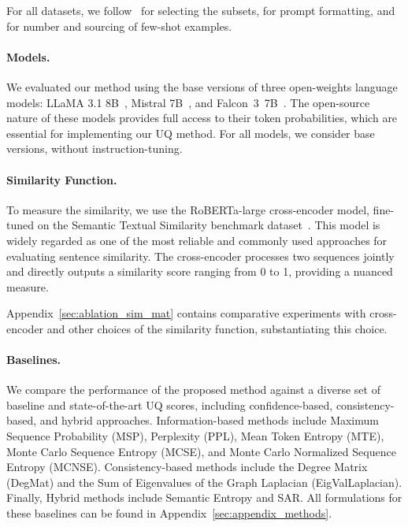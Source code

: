   For all datasets, we follow~\citep{vashurin2024benchmarkinguncertaintyquantificationmethods} for selecting the subsets, for prompt formatting, and for number and sourcing of few-shot examples.

\paragraph{Models.}
  We evaluated our method using the base versions of three open-weights language models: LLaMA 3.1 8B~\cite{touvron2023llama}, Mistral 7B~\cite{mistral}, and Falcon~3~7B~\cite{Falcon3}. The open-source nature of these models provides full access to their token probabilities, which are essential for implementing our UQ method. For all models, we consider base versions, without instruction-tuning.

   

\paragraph{Similarity Function.}
  To measure the similarity, we use the RoBERTa-large cross-encoder model, fine-tuned on the Semantic Textual Similarity benchmark dataset~\citep{liu2019robertarobustlyoptimizedbert,DBLP:journals/corr/abs-1908-10084,huggingface:dataset:stsb_multi_mt}. This model is widely regarded as one of the most reliable and commonly used approaches for evaluating sentence similarity. The cross-encoder processes two sequences jointly and directly outputs a similarity score ranging from 0 to 1, providing a nuanced measure.

  Appendix~\ref{sec:ablation_sim_mat} contains comparative experiments with cross-encoder and other choices of the similarity function, substantiating this choice.


\paragraph{Baselines.} 
  We compare the performance of the proposed method against a diverse set of baseline and state-of-the-art UQ scores, including confidence-based, consistency-based, and hybrid approaches. Information-based methods include Maximum Sequence Probability (MSP), Perplexity (PPL), Mean Token Entropy (MTE), Monte Carlo Sequence Entropy (MCSE), and Monte Carlo Normalized Sequence Entropy (MCNSE). Consistency-based methods include the Degree Matrix (DegMat) and the Sum of Eigenvalues of the Graph Laplacian (EigValLaplacian). Finally, Hybrid methods include Semantic Entropy and SAR. All formulations for these baselines can be found in Appendix~\ref{sec:appendix_methods}.

